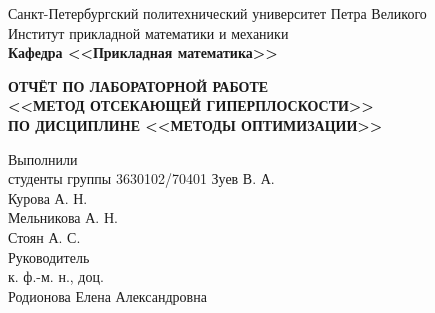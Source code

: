 \documentclass[main.tex]{subfiles}
\begin{document}
\begin{titlepage}
\begin{center}
	\begin{large}
		Санкт-Петербургский политехнический университет Петра Великого\\
		Институт прикладной математики и механики\\
		\textbf{Кафедра <<Прикладная математика>>}\\
	\end{large}
	\vfill
	\Large{\textbf{ОТЧЁТ ПО ЛАБОРАТОРНОЙ РАБОТЕ\\
	<<МЕТОД ОТСЕКАЮЩЕЙ ГИПЕРПЛОСКОСТИ>>\\
	ПО ДИСЦИПЛИНЕ <<МЕТОДЫ ОПТИМИЗАЦИИ>>}}
\end{center}
\vfill
\flushleft
Выполнили\\
студенты группы 3630102/70401
\flushright
Зуев В. А.\\
Курова А. Н.\\
Мельникова А. Н.\\
Стоян А. С.\\ 
\flushleft
Руководитель\\
к. ф.-м. н., доц.\\
\flushright
Родионова Елена Александровна
\vfill
{}
\end{titlepage}
\end{document}

